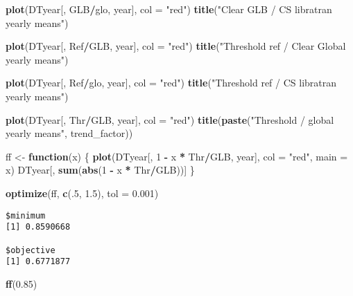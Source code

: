 \documentclass[
  10pt,
  a4paper,oneside]{article}
\newenvironment{Shaded}{\begin{snugshade}}{\end{snugshade}}
\newcommand{\AttributeTok}[1]{\textcolor[rgb]{0.13,0.29,0.53}{#1}}
\newcommand{\ControlFlowTok}[1]{\textcolor[rgb]{0.13,0.29,0.53}{\textbf{#1}}}
\newcommand{\DecValTok}[1]{\textcolor[rgb]{0.00,0.00,0.81}{#1}}
\newcommand{\FloatTok}[1]{\textcolor[rgb]{0.00,0.00,0.81}{#1}}
\newcommand{\FunctionTok}[1]{\textcolor[rgb]{0.13,0.29,0.53}{\textbf{#1}}}
\newcommand{\NormalTok}[1]{#1}
\newcommand{\OtherTok}[1]{\textcolor[rgb]{0.56,0.35,0.01}{#1}}
\newcommand{\SpecialCharTok}[1]{\textcolor[rgb]{0.81,0.36,0.00}{\textbf{#1}}}
\newcommand{\StringTok}[1]{\textcolor[rgb]{0.31,0.60,0.02}{#1}}
\begin{document}
\begin{Shaded}
\begin{Highlighting}[]
\FunctionTok{plot}\NormalTok{(DTyear[, GLB}\SpecialCharTok{/}\NormalTok{glo, year], }\AttributeTok{col =} \StringTok{"red"}\NormalTok{)}
\FunctionTok{title}\NormalTok{(}\StringTok{"Clear GLB / CS libratran yearly means"}\NormalTok{)}

\FunctionTok{plot}\NormalTok{(DTyear[, Ref}\SpecialCharTok{/}\NormalTok{GLB, year], }\AttributeTok{col =} \StringTok{"red"}\NormalTok{)}
\FunctionTok{title}\NormalTok{(}\StringTok{"Threshold ref / Clear Global yearly means"}\NormalTok{)}


\FunctionTok{plot}\NormalTok{(DTyear[, Ref}\SpecialCharTok{/}\NormalTok{glo, year], }\AttributeTok{col =} \StringTok{"red"}\NormalTok{)}
\FunctionTok{title}\NormalTok{(}\StringTok{"Threshold ref / CS libratran yearly means"}\NormalTok{)}

\FunctionTok{plot}\NormalTok{(DTyear[, Thr}\SpecialCharTok{/}\NormalTok{GLB, year], }\AttributeTok{col =} \StringTok{"red"}\NormalTok{)}
\FunctionTok{title}\NormalTok{(}\FunctionTok{paste}\NormalTok{(}\StringTok{"Threshold / global yearly means"}\NormalTok{, trend\_factor))}


\NormalTok{ff }\OtherTok{\textless{}{-}} \ControlFlowTok{function}\NormalTok{(x) \{}
    \FunctionTok{plot}\NormalTok{(DTyear[, }\DecValTok{1} \SpecialCharTok{{-}}\NormalTok{ x }\SpecialCharTok{*}\NormalTok{ Thr}\SpecialCharTok{/}\NormalTok{GLB, year], }\AttributeTok{col =} \StringTok{"red"}\NormalTok{, }\AttributeTok{main =}\NormalTok{ x)}
\NormalTok{    DTyear[, }\FunctionTok{sum}\NormalTok{(}\FunctionTok{abs}\NormalTok{(}\DecValTok{1} \SpecialCharTok{{-}}\NormalTok{ x }\SpecialCharTok{*}\NormalTok{ Thr}\SpecialCharTok{/}\NormalTok{GLB))]}
\NormalTok{\}}



\FunctionTok{optimize}\NormalTok{(ff, }\FunctionTok{c}\NormalTok{(.}\DecValTok{5}\NormalTok{, }\FloatTok{1.5}\NormalTok{), }\AttributeTok{tol =} \FloatTok{0.001}\NormalTok{)}
\end{Highlighting}
\end{Shaded}

\begin{verbatim}
$minimum
[1] 0.8590668

$objective
[1] 0.6771877
\end{verbatim}

\begin{Shaded}
\begin{Highlighting}[]
\FunctionTok{ff}\NormalTok{(}\FloatTok{0.85}\NormalTok{)}
\end{Highlighting}
\end{Shaded}
\end{document}

